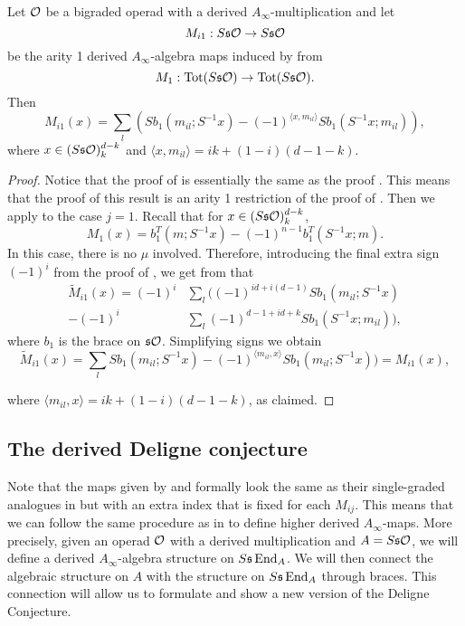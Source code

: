 \documentclass[Thesis.tex]{subfiles}
\begin{document}
\begin{corollary}\label{mi1}
Let ${\mathcal O}$ be a bigraded operad with a derived $A_\infty$-multiplication and let \[M_{i1}:S\mathfrak{s}{\mathcal O}\to S\mathfrak{s}{\mathcal O}\] be the arity 1 derived $A_\infty$-algebra maps induced by  from \[M_1:\operatorname{Tot}(S\mathfrak{s}{\mathcal O})\to \operatorname{Tot}(S\mathfrak{s}{\mathcal O}).\]
Then \[M_{i1}(x)= \sum_l (Sb_1(m_{il};S^{-1}x)-(-1)^{\langle x,m_{il}\rangle}Sb_1(S^{-1}x;m_{il})),\]
where $x\in (S\mathfrak{s}{\mathcal O})^{d-k}_k$ and $\langle x,m_{il}\rangle=ik+(1-i)(d-1-k)$.
\end{corollary}
\begin{proof}
Notice that the proof of  is essentially the same as the proof . This means that the proof of this result is an arity 1 restriction of the proof of . Then we apply  to the case $j=1$. Recall that for $x\in (S\mathfrak{s}{\mathcal O})^{d-k}_{k}$,
\[M_1(x)=b_1^T(m;S^{-1}x)-(-1)^{n-1}b_1^T(S^{-1}x;m).\]
 In this case, there is no $\mu$ involved. Therefore, introducing the final extra sign $(-1)^i$ from the proof of , we get from  that
\begin{align*}
\widetilde{M}_{i1}(x)=(-1)^i&\sum_l((-1)^{id+i(d-1)} Sb_1(m_{il};S^{-1}x)\\
-(-1)^i&\sum_l(-1)^{d-1+id+k}Sb_1(S^{-1}x;m_{il})),
\end{align*} where $b_1$ is the brace on $\mathfrak{s}{\mathcal O}$. Simplifying signs we obtain
\[\widetilde{M}_{i1}(x)=\sum_l Sb_1(m_{il};S^{-1}x)-(-1)^{\langle  m_{il},x\rangle}Sb_1(m_{il};S^{-1}x))=M_{i1}(x),\]

where $\langle  m_{il},x\rangle=ik+(1-i)(d-1-k)$, as claimed.
\end{proof}

\subsection{The derived Deligne conjecture}

Note that the maps given by  and  formally look the same as their single-graded analogues in  but with an extra index that is fixed for each $M_{ij}$. This means that we can follow the same procedure as in  to define higher derived $A_\infty$-maps. More precisely, given an operad ${\mathcal O}$ with a derived multiplication and $A=S\mathfrak{s}{\mathcal O}$, we will define a derived $A_\infty$-algebra structure on $S\mathfrak{s}\operatorname{End}_A$. We will then connect the algebraic structure on $A$ with the structure on $S\mathfrak{s}\operatorname{End}_A$ through braces. This connection will allow us to formulate and show a new version of the Deligne Conjecture.
\end{document}
